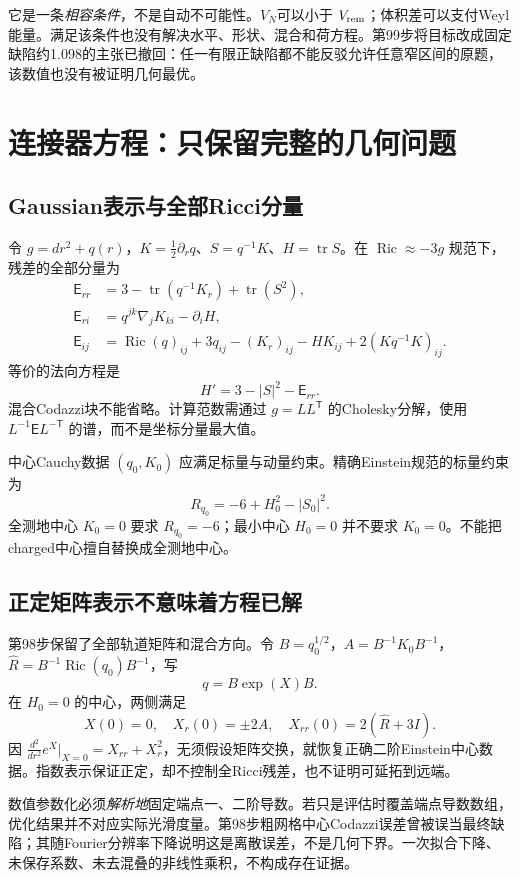 \documentclass[UTF8,a4paper,11pt,fontset=fandol]{ctexart}
\numberwithin{equation}{section}
\theoremstyle{definition}
\newcommand{\Ric}{\operatorname{Ric}}
\newcommand{\tr}{\operatorname{tr}}
\begin{document}
它是一条\emph{相容条件}，不是自动不可能性。$V_N$可以小于 $V_{\rm rem}$；体积差可以支付Weyl能量。满足该条件也没有解决水平、形状、混合和荷方程。第99步将目标改成固定缺陷约1.098的主张已撤回：任一有限正缺陷都不能反驳允许任意窄区间的原题，该数值也没有被证明几何最优。

\section{连接器方程：只保留完整的几何问题}
\subsection{Gaussian表示与全部Ricci分量}
令 $g=dr^2+q(r)$，$K=\frac12\partial_rq$、$S=q^{-1}K$、$H=\tr S$。在 $\Ric\approx-3g$ 规范下，残差的全部分量为
\begin{align}
\mathsf E_{rr}&=3-\tr(q^{-1}K_r)+\tr(S^2),\\
\mathsf E_{ri}&=q^{jk}\nabla_jK_{ki}-\partial_iH,\\
\mathsf E_{ij}&=\Ric(q)_{ij}+3q_{ij}-(K_r)_{ij}-HK_{ij}
+2(Kq^{-1}K)_{ij}.\label{eq:fullRic}
\end{align}
等价的法向方程是
\[
H'=3-|S|^2-\mathsf E_{rr}.
\]
混合Codazzi块不能省略。计算范数需通过 $g=LL^{\mathsf T}$ 的Cholesky分解，使用 $L^{-1}\mathsf E L^{-\mathsf T}$ 的谱，而不是坐标分量最大值。

中心Cauchy数据 $(q_0,K_0)$ 应满足标量与动量约束。精确Einstein规范的标量约束为
\[
R_{q_0}=-6+H_0^2-|S_0|^2.
\]
全测地中心 $K_0=0$ 要求 $R_{q_0}=-6$；最小中心 $H_0=0$ 并不要求 $K_0=0$。不能把charged中心擅自替换成全测地中心。

\subsection{正定矩阵表示不意味着方程已解}
第98步保留了全部轨道矩阵和混合方向。令 $B=q_0^{1/2}$，$A=B^{-1}K_0B^{-1}$，$\widehat R=B^{-1}\Ric(q_0)B^{-1}$，写
\[
q=B\exp(X)B.
\]
在 $H_0=0$ 的中心，两侧满足
\[
X(0)=0,\quad X_r(0)=\pm2A,\quad X_{rr}(0)=2(\widehat R+3I).
\]
因 $\frac{d^2}{dr^2}e^X|_{X=0}=X_{rr}+X_r^2$，无须假设矩阵交换，就恢复正确二阶Einstein中心数据。指数表示保证正定，却不控制全Ricci残差，也不证明可延拓到远端。

数值参数化必须\emph{解析地}固定端点一、二阶导数。若只是评估时覆盖端点导数数组，优化结果并不对应实际光滑度量。第98步粗网格中心Codazzi误差曾被误当最终缺陷；其随Fourier分辨率下降说明这是离散误差，不是几何下界。一次拟合下降、未保存系数、未去混叠的非线性乘积，不构成存在证据。
\end{document}
